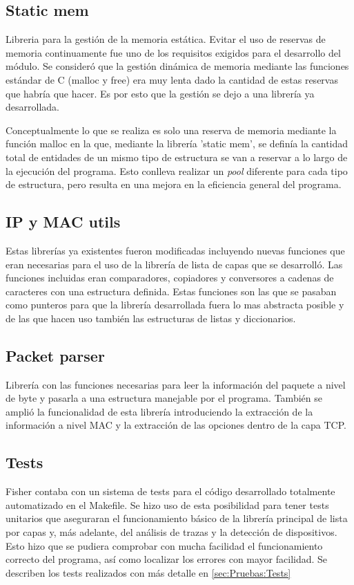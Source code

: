 \documentclass[twoside, 12pt]{epstfg}
\begin{document}
\subsection{Static mem}
Libreria para la gestión de la memoria estática. Evitar el uso de reservas de memoria continuamente fue uno de los requisitos exigidos para el desarrollo del módulo. Se consideró que la gestión dinámica de memoria mediante las funciones estándar de C (malloc y free) era muy lenta dado la cantidad de estas reservas que habría que hacer. Es por esto que la gestión se dejo a una librería ya desarrollada. 

Conceptualmente lo que se realiza es solo una reserva de memoria mediante la función malloc en la que, mediante la librería 'static mem', se definía la cantidad total de entidades de un mismo tipo de estructura se van a reservar a lo largo de la ejecución del programa. Esto conlleva realizar un \textit{pool} diferente para cada tipo de estructura, pero resulta en una mejora en la eficiencia general del programa. 
\subsection{IP y MAC utils}
Estas librerías ya existentes fueron modificadas incluyendo nuevas funciones que eran necesarias para el uso de la librería de lista de capas que se desarrolló. Las funciones incluidas eran comparadores, copiadores y conversores a cadenas de caracteres con una estructura definida. Estas funciones son las que se pasaban como punteros para que la librería desarrollada fuera lo mas abstracta posible y de las que hacen uso también las estructuras de listas y diccionarios.
\subsection{Packet parser}
Librería con las funciones necesarias para leer la información del paquete a nivel de byte y pasarla a una estructura manejable por el programa. También se amplió la funcionalidad de esta librería introduciendo la extracción de la información a nivel MAC y la extracción de las opciones dentro de la capa TCP.
\subsection{Tests}
Fisher contaba con un sistema de tests para el código desarrollado totalmente automatizado en el Makefile. Se hizo uso de esta posibilidad para tener tests unitarios que aseguraran el funcionamiento básico de la librería principal de lista por capas y, más adelante, del análisis de trazas y la detección de dispositivos. Esto hizo que se pudiera comprobar con mucha facilidad el funcionamiento correcto del programa, así como localizar los errores con mayor facilidad. Se describen los tests realizados con más detalle en \ref{sec:Pruebas:Tests}
\end{document}
